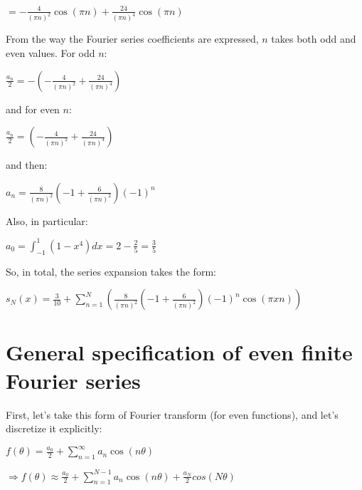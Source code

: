 \documentclass[paper=a4, fontsize=11pt]{scrartcl} %
\numberwithin{equation}{section} %
\numberwithin{figure}{section} %
\numberwithin{table}{section} %
\begin{document}
\begin{center}
$ = -\frac{4}{(\pi n)^{2}}\cos(\pi n)+ \frac{24}{(\pi n)^{4}}\cos(\pi n)$
\end{center}

From the way the Fourier series coefficients are expressed, $n$ takes both odd and even values. For odd $n$:

\begin{center}
$\frac{a_{n}}{2} = -\left(-\frac{4}{(\pi n)^{2}}+ \frac{24}{(\pi n)^{4}}\right)$
\end{center}

and for even $n$:

\begin{center}
$\frac{a_{n}}{2} = \left(-\frac{4}{(\pi n)^{2}}+ \frac{24}{(\pi n)^{4}}\right)$
\end{center}

and then:

\begin{center}
$a_{n} = \frac{8}{(\pi n)^{2}}\left(-1+ \frac{6}{(\pi n)^{2}}\right)(-1)^{n}$
\end{center}

Also, in particular:

\begin{center}
$a_{0} = \int_{-1}^{1}(1-x^{4})dx = 2-\frac{2}{5} = \frac{3}{5}$
\end{center}

So, in total, the series expansion takes the form:

\begin{center}
$s_{N}(x) = \frac{3}{10}+\sum_{n=1}^{N}\left( \frac{8}{(\pi n)^{2}}\left(-1+ \frac{6}{(\pi n)^{2}}\right)(-1)^{n} \cos(\pi x n) \right)$
\end{center}


\section{General specification of even finite Fourier series}

First, let's take this form of Fourier transform (for even functions), and let's discretize it explicitly:

\begin{center}
$f(\theta) = \frac{a_{0}}{2}+\sum_{n=1}^{\infty}a_{n}\cos(n\theta)$
\end{center}

\begin{center}
$\Rightarrow f(\theta) \approx \frac{a_{0}}{2}+\sum_{n=1}^{N-1}a_{n}\cos(n\theta)+\frac{a_{N}}{2}cos(N\theta)$
\end{center}
\end{document}
